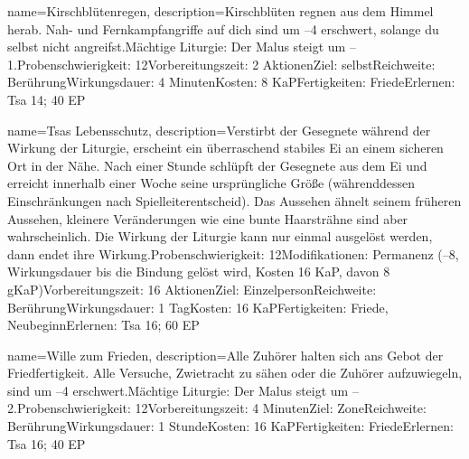 {
    name={Kirschblütenregen},
    description={Kirschblüten regnen aus dem Himmel herab. Nah- und Fernkampfangriffe auf dich sind um –4 erschwert, solange du selbst nicht angreifst.\newline Mächtige Liturgie: Der Malus steigt um –1.\newline Probenschwierigkeit: 12\newline Vorbereitungszeit: 2 Aktionen\newline Ziel: selbst\newline Reichweite: Berührung\newline Wirkungsdauer: 4 Minuten\newline Kosten: 8 KaP\newline Fertigkeiten: Friede\newline Erlernen: Tsa 14; 40 EP}
}


{
    name={Tsas Lebensschutz},
    description={Verstirbt der Gesegnete während der Wirkung der Liturgie, erscheint ein überraschend stabiles  Ei an einem sicheren Ort in der Nähe. Nach einer Stunde schlüpft der Gesegnete aus dem Ei und erreicht innerhalb einer Woche seine ursprüngliche Größe (währenddessen Einschränkungen nach Spielleiterentscheid). Das Aussehen ähnelt seinem früheren Aussehen, kleinere Veränderungen wie eine bunte Haarsträhne sind aber wahrscheinlich. Die Wirkung der Liturgie kann nur einmal ausgelöst werden, dann endet ihre Wirkung.\newline Probenschwierigkeit: 12\newline Modifikationen: Permanenz (–8, Wirkungsdauer bis die Bindung gelöst wird, Kosten 16 KaP, davon 8 gKaP)\newline Vorbereitungszeit: 16 Aktionen\newline Ziel: Einzelperson\newline Reichweite: Berührung\newline Wirkungsdauer: 1 Tag\newline Kosten: 16 KaP\newline Fertigkeiten: Friede, Neubeginn\newline Erlernen: Tsa 16; 60 EP}
}


{
    name={Wille zum Frieden},
    description={Alle Zuhörer halten sich ans Gebot der Friedfertigkeit. Alle Versuche, Zwietracht zu sähen oder die Zuhörer aufzuwiegeln, sind um –4 erschwert.\newline Mächtige Liturgie: Der Malus steigt um –2.\newline Probenschwierigkeit: 12\newline Vorbereitungszeit: 4 Minuten\newline Ziel: Zone\newline Reichweite: Berührung\newline Wirkungsdauer: 1 Stunde\newline Kosten: 16 KaP\newline Fertigkeiten: Friede\newline Erlernen: Tsa 16; 40 EP}
}


